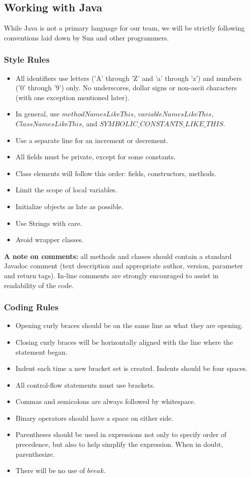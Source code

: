\documentclass[12pt]{article}
\begin{document}
\subsection{Working with Java}
While Java is not a primary language for our team, we will be strictly following conventions laid down by Sun and other programmers\cite{JavaStyle-Sun}\cite{JavaStyle-JavaRanch}.

\subsubsection{Style Rules}
\begin{itemize}
\item All identifiers use letters ('A' through 'Z' and 'a' through 'z') and numbers ('0' through '9') only. No underscores, dollar signs or non-ascii characters (with one exception mentioned later).
\item In general, use $methodNamesLikeThis$, $variableNamesLikeThis$, $ClassNamesLikeThis$, and $SYMBOLIC\_CONSTANTS\_LIKE\_THIS$.
\item Use a separate line for an increment or decrement.
\item All fields must be private, except for some constants.
\item Class elements will follow this order: fields, constructors, methods. 
\item Limit the scope of local variables.
\item Initialize objects as late as possible.
\item Use Strings with care.
\item Avoid wrapper classes.
\end{itemize}
\textbf{A note on comments:} all methods and classes should contain a standard Javadoc comment (text description and appropriate author, version, parameter and return tags).  In-line comments are strongly encouraged to assist in readability of the code.

\subsubsection{Coding Rules}
\begin{itemize}
\item Opening curly braces should be on the same line as what they are opening.
\item Closing curly braces will be horizontally aligned with the line where the statement began.
\item Indent each time a new bracket set is created.  Indents should be four spaces.
\item All control-flow statements must use brackets.
\item Commas and semicolons are always followed by whitespace.
\item Binary operators should have a space on either side.
\item Parentheses should be used in expressions not only to specify order of precedence, but also to help simplify the expression. When in doubt, parenthesize. 
\item There will be no use of $break$.
\end{itemize}
\end{document}
